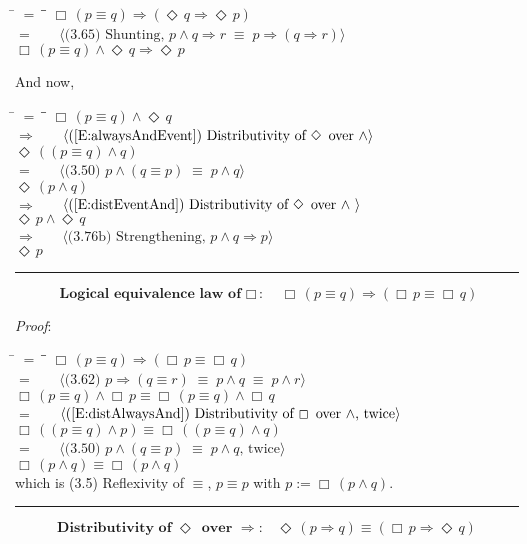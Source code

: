 \documentclass[12pt, fleqn, leqno]{article}
\newcommand{\lgap}{2pt}                             %
\newcommand{\mymathindent}{24pt}                    %
\newcommand{\equivs}{\ensuremath{\;\equiv\;}}       %
\newcommand{\impl}{\ensuremath{\Rightarrow}}        %
\newcommand{\Event}{\Diamond\,}
\newcommand{\Always}{\Box\,}
\newcommand{\myqed}{\rule[-.23ex]{1.2ex}{2.0ex}}
\newcommand{\myqedtab}{\hspace{384pt}}              %
\newcommand{\Gll} {\langle}                         %
\newcommand{\Ggg} {\rangle}                         %
\newcommand{\Hint}[1]     {\ \ \ $\Gll              \mbox{#1} \Ggg$ }   %
\begin{document}
\begin{tabbing}
\hspace{\mymathindent} \= $= \;$ \= \myqedtab \= \kill
  \> \>   $\Always (p \equiv q) \impl (\Event q \impl \Event p)$\\[\lgap]
  \> $=$  \>  \Hint{(3.65) Shunting, $p\land q\impl r\equivs p\impl (q\impl r)$}\\[\lgap]
  \> \>   $\Always (p \equiv q) \land \Event q \impl \Event p$
\end{tabbing}
And now,
\begin{tabbing}
\hspace{\mymathindent} \= $= \;$ \= \myqedtab \= \kill
  \> \>   $\Always (p \equiv q) \land \Event q$\\[\lgap]
  \> $\impl$  \>  \Hint{(\ref{E:alwaysAndEvent}) Distributivity of $\Event$ over $\land$}\\[\lgap]
  \> \>   $\Event ((p \equiv q) \land q)$\\[\lgap]
   \> $=$  \>  \Hint{(3.50) $p\land (q\equiv p)\equivs p\land q$}\\[\lgap]
  \> \>   $\Event (p \land q)$\\[\lgap]
  \> $\impl$  \>  \Hint{(\ref{E:distEventAnd}) Distributivity of $\Event$ over $\land$ }\\[\lgap]
  \> \>   $\Event p \land \Event q $\\[\lgap]
  \> $\impl$ \> \Hint{(3.76b) Strengthening, $p\land q \impl p$} \\[\lgap]
  \> \>   $\Event p$\quad \myqed
\end{tabbing}
\begin{equation}\label{E:distAlwaysEquiv}
\textbf{Logical equivalence law of $\Always$:}\quad \Always (p \equiv q) \impl (\Always p \equiv \Always q)
\end{equation}

\emph{Proof}:
\begin{tabbing}
\hspace{\mymathindent} \= $= \;$ \= \myqedtab \= \kill
  \> \>   $\Always (p \equiv q) \impl (\Always p \equiv \Always q)$\\[\lgap]
  \> $=$  \>  \Hint{(3.62) $p\impl (q\equiv r) \equivs p\land q\equivs p\land r$}\\[\lgap]
  \> \>   $\Always (p \equiv q) \land \Always p \equiv \Always (p \equiv q) \land \Always q$\\[\lgap]
  \> $=$  \>  \Hint{(\ref{E:distAlwaysAnd}) Distributivity of $\Always$ over $\land$, twice}\\[\lgap]
  \> \>   $\Always((p \equiv q) \land p) \equiv \Always((p \equiv q) \land q)$\\[\lgap]
  \> $=$  \>  \Hint{(3.50) $p\land (q\equiv p)\equivs p\land q$, twice}\\[\lgap]
  \> \>   $\Always(p \land q) \equiv \Always (p \land q)$\\[\lgap]
  \> which is (3.5) Reflexivity of $\equiv$, $p\equiv p$ with $p:=\Always(p \land q)$. \quad \myqed
\end{tabbing}
\begin{equation}\label{E:eventImpAlways}
\textbf{Distributivity of $\Event$ over $\impl$:}\quad \Event (p \impl q) \equiv (\Always p \impl \Event q)
\end{equation}
\end{document}

